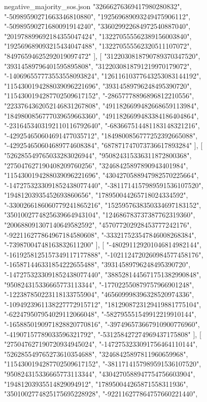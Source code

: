 \begin{filecontents*}[overwrite]{negative_majority_sos.json}
    "32666276369417980280832",
    "-50989590271663346810880",
    "192569689093249475906112",
    "-50989590271680091914240",
    "336029922684972540887040",
    "201978899692184355047424",
    "132270555562389156003840",
    "192569689093215434047488",
    "132270555562320511107072",
    "84976594625292019097472"
   ],
   [
    "3122030818790789370347520",
    "39314589796401595895808",
    "3122030818791219970179072",
    "-140696557773553558093824",
    "12611610377643253083144192",
    "1154300194288039096221696",
    "39314589796248495390720",
    "1154300194287702509617152",
    "-28657778896896812210556",
    "2233764362052146831267808",
    "4911826699482668659113984",
    "1849800856777039659663360",
    "4911826699483384186404864",
    "-2316453403192110116792640",
    "-683667514481183148321216",
    "-429254650604691477035712",
    "1849800856777252392665088",
    "-429254650604689774608384",
    "687871747073736617893284"
   ],
   [
    "526285549765033283026944",
    "950824315336311872800368",
    "275047627190408209760256",
    "32468425897890943401984",
    "1154300194288039096221696",
    "4304270588947982570225664",
    "-1472753233091852438077440",
    "-3811714157989591536107520",
    "19481203935452693860656",
    "178950044265718024334592",
    "-3300266186060779241865216",
    "1525957638350334697183152",
    "3501002774825639664943104",
    "124686783737387762319360",
    "200688091307140649582592",
    "457077202928453777242176",
    "-922116277864967184580608",
    "-333217523547846008268384",
    "-73987004748163832611200"
   ],
   [
    "-480291129201046814982144",
    "-1619258125157349117177888",
    "-1021124720260984577458176",
    "-165871446331854222655488",
    "39314589796248495390720",
    "-1472753233091852438077440",
    "3885281445671751382990848",
    "950824315336665773113344",
    "-177022550879757966901248",
    "-122387850223118133755904",
    "465609998396328520974336",
    "-1094923961138227772915712",
    "1812908723129419881775104",
    "-622479507954029112066048",
    "-582795551549912219910144",
    "-1658850190971828820770816",
    "-397496573667910900776960",
    "-41907157789033596321792",
    "-531258427274969437175808"
   ],
   [
    "275047627190720934945024",
    "-1472753233091756464110144",
    "526285549765273610354688",
    "32468425897811960659968",
    "1154300194287702509617152",
    "-3811714157989591536107520",
    "950824315336665773113344",
    "4304270588947754756603904",
    "19481203935514829094912",
    "178950044265871558311936",
    "3501002774825175695228928",
    "-922116277864757660221440",

\end{filecontents*}
